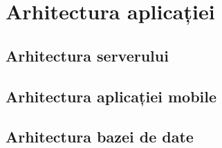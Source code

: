 \chapter{Arhitectura aplicației}


\section{Arhitectura serverului}



\section{Arhitectura aplicației mobile}


\section{Arhitectura bazei de date}


